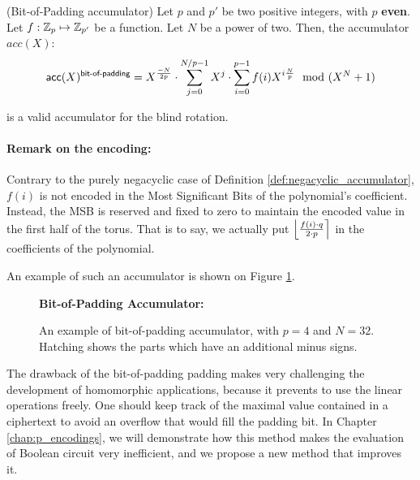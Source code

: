 \begin{definition}(Bit-of-Padding accumulator)
	Let $p$ and $p'$ be two positive integers, with $p$ \textbf{even}. Let $f: \mathbb{Z}_p \mapsto \mathbb{Z}_{p'}$ be a function. Let $N$ be a power of two. Then, the accumulator $acc(X)$:
	\[
		\textsf{acc}(X)^{\textsf{bit-of-padding}} = X^{\frac{-N}{2p}} \cdot \sum_{j=0}^{N / p - 1} X^j \cdot \sum_{i=0}^{p - 1} f(i) X^{i \frac{N}{p}} \mod (X^N + 1)
	\]
	
\noindent is a valid accumulator for the blind rotation.
	\paragraph{Remark on the encoding:}
	Contrary to the purely negacyclic case of Definition \ref{def:negacyclic_accumulator}, $f(i)$ is not encoded in the Most Significant Bits of the polynomial's coefficient. Instead, the \gls{MSB} is reserved and fixed to zero to maintain the encoded value in the first half of the torus. That is to say, we actually put $\left \lfloor \frac{f(i) \cdot q}{2 \cdot p} \right \rceil$ in the coefficients of the polynomial.
\end{definition}


An example of such an accumulator is shown on Figure \ref{fig:negacyclic_accumulator}.

\begin{figure}[H]
	\centering
				
	\vspace{1.5em}
	
	\textbf{Bit-of-Padding Accumulator:}\\[0.5em]
	
	\caption{An example of bit-of-padding accumulator, with $p=4$ and $N = 32$. Hatching shows the parts which have an additional minus signs.}
	\label{fig:negacyclic_accumulator}
\end{figure}





The drawback of the bit-of-padding padding makes very challenging the development of homomorphic applications, because it prevents to use the linear operations freely. One should keep track of the maximal value contained in a ciphertext to avoid an overflow that would fill the padding bit. In Chapter \ref{chap:p_encodings}, we will demonstrate how this method makes the evaluation of Boolean circuit very inefficient, and we propose a new method that improves it.

